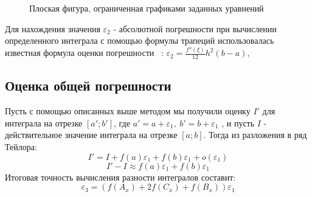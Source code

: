 \documentclass[a4paper,12pt,titlepage,finall]{article}
\begin{document}
\begin{figure}[h]
\centering
{}
\caption{Плоская фигура, ограниченная графиками заданных уравнений}
\label{plot1}
\end{figure}

Для нахождения значения $\varepsilon_2$ - абсолютной погрешности при вычислении
определенного интеграла с помощью формулы трапеций
использовалась известная формула оценки погрешности ~\cite{math}:
 $\varepsilon_2 = \frac{f''(\xi)}{12} h^2 (b-a)$,

\subsection{Оценка общей погрешности}
Пусть с помощью описанных выше методом мы получили оценку $I'$ для интеграла
на отрезке $[a';b']$, где 
$a' = a + \varepsilon_1,~b'=b+\varepsilon_1$
, и пусть $I$ - действительное значение интеграла на отрезке $[a;b]$. 
Тогда из разложения в ряд Тейлора:
\[I' = I + f(a)\varepsilon_1 + f(b)\varepsilon_1 + o(\varepsilon_1)\]
\[I' - I \approx f(a)\varepsilon_1 + f(b)\varepsilon_1\]
Итоговая точность вычисления разности интегралов составит:
\[\varepsilon_3 = (f(A_x) + 2f(C_x) + f(B_x))\varepsilon_1\]
\end{document}
